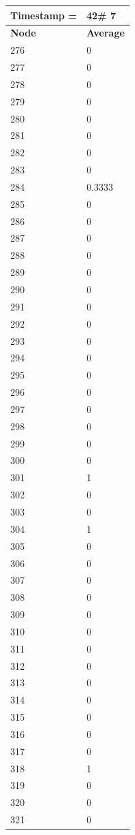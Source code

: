 \begin{tabular}{|l||l|}
\hline
\textbf{Timestamp =} & \textbf{42}\# 7\\\hline
	\textbf{Node} & \textbf{Average} \\ \hline
\hline
	276 & 0 \\ \hline
	277 & 0 \\ \hline
	278 & 0 \\ \hline
	279 & 0 \\ \hline
	280 & 0 \\ \hline
	281 & 0 \\ \hline
	282 & 0 \\ \hline
	283 & 0 \\ \hline
	284 & 0.3333 \\ \hline
	285 & 0 \\ \hline
	286 & 0 \\ \hline
	287 & 0 \\ \hline
	288 & 0 \\ \hline
	289 & 0 \\ \hline
	290 & 0 \\ \hline
	291 & 0 \\ \hline
	292 & 0 \\ \hline
	293 & 0 \\ \hline
	294 & 0 \\ \hline
	295 & 0 \\ \hline
	296 & 0 \\ \hline
	297 & 0 \\ \hline
	298 & 0 \\ \hline
	299 & 0 \\ \hline
	300 & 0 \\ \hline
	301 & 1 \\ \hline
	302 & 0 \\ \hline
	303 & 0 \\ \hline
	304 & 1 \\ \hline
	305 & 0 \\ \hline
	306 & 0 \\ \hline
	307 & 0 \\ \hline
	308 & 0 \\ \hline
	309 & 0 \\ \hline
	310 & 0 \\ \hline
	311 & 0 \\ \hline
	312 & 0 \\ \hline
	313 & 0 \\ \hline
	314 & 0 \\ \hline
	315 & 0 \\ \hline
	316 & 0 \\ \hline
	317 & 0 \\ \hline
	318 & 1 \\ \hline
	319 & 0 \\ \hline
	320 & 0 \\ \hline
	321 & 0 \\ \hline
\end{tabular}
